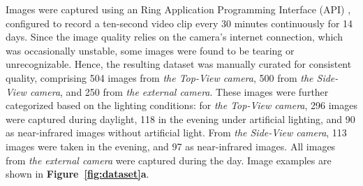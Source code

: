 Images were captured using an Ring Application Programming Interface (API) \cite{greif_dgreifring_2024}, configured to record a ten-second video clip every 30 minutes continuously for 14 days. Since the image quality relies on the camera's internet connection, which was occasionally unstable, some images were found to be tearing or unrecognizable. Hence, the resulting dataset was manually curated for consistent quality, comprising 504 images from \textit{the Top-View camera}, 500 from \textit{the Side-View camera}, and 250 from \textit{the external camera}. These images were further categorized based on the lighting conditions: for \textit{the Top-View camera}, 296 images were captured during daylight, 118 in the evening under artificial lighting, and 90 as near-infrared images without artificial light. From \textit{the Side-View camera}, 113 images were taken in the evening, and 97 as near-infrared images. All images from \textit{the external camera} were captured during the day. Image examples are shown in \textbf{Figure~\ref{fig:dataset}a}.

